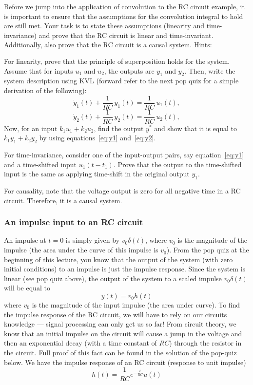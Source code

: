 \documentclass{ee102_notes}
\begin{document}
\begin{popquiz}
    Before we jump into the application of convolution to the RC circuit example, it is important to ensure that the assumptions for the convolution integral to hold are still met. Your task is to state these assumptions (linearity and time-invariance) and prove that the RC circuit is linear and time-invariant. Additionally, also prove that the RC circuit is a causal system.
    \popqsplit
    Hints:
    
    For linearity, prove that the principle of superposition holds for the system. Assume that for inputs $u_1$ and $u_2$, the outputs are $y_1$ and $y_2$. 
    Then, write the system description using KVL (forward refer to the next pop quiz for a simple derivation of the following):
    \begin{equation}
        \label{eq:y1}
    \dot y_1(t)+\frac{1}{RC}\,y_1(t)=\frac{1}{RC}\,u_1(t),
    \end{equation}
    \begin{equation}
    \dot y_2(t)+\frac{1}{RC}\,y_2(t)=\frac{1}{RC}\,u_2(t),
    \label{eq:y2}
    \end{equation}
    Now, for an input $k_1u_1 + k_2u_2$, find the output $y^*$ and show that it is equal to $k_1y_1 + k_2y_2$ by using equations~\eqref{eq:y1} and~\eqref{eq:y2}. 

    For time-invariance, consider one of the input-output pairs, say equation~\eqref{eq:y1} and a time-shifted input $u_1(t - t_1)$. Prove that the output to the time-shifted input is the same as applying time-shift in the original output $y_1$.

    For causality, note that the voltage output is zero for all negative time in a RC circuit. Therefore, it is a causal system.
\end{popquiz}

\subsubsection{An impulse input to an RC circuit}
An impulse at $t = 0$ is simply given by $v_0\delta(t)$, where $v_0$ is the magnitude of the impulse (the area under the curve of this impulse is $v_0$). From the pop quiz at the beginning of this lecture, you know that the output of the system (with zero initial conditions) to an impulse is just the impulse response. Since the system is linear (see pop quiz above), the output of the system to a scaled impulse $v_0\delta(t)$ will be equal to   
\[
y(t) = v_0 h(t)
\] 
where $v_0$ is the magnitude of the input impulse (the area under curve). To find the impulse response of the RC circuit, we will have to rely on our circuits knowledge --- signal processing can only get us so far! From circuit theory, we know that an initial impulse on the circuit will cause a jump in the voltage and then an exponential decay (with a time constant of $RC$) through the resistor in the circuit. Full proof of this fact can be found in the solution of the pop-quiz below. We have the impulse response of an RC circuit (response to unit impulse)
\begin{equation}
\label{eq:h-rc}
h(t) = \frac{1}{RC}e^{-\frac{t}{RC}}u(t)
\end{equation}
\end{document}
